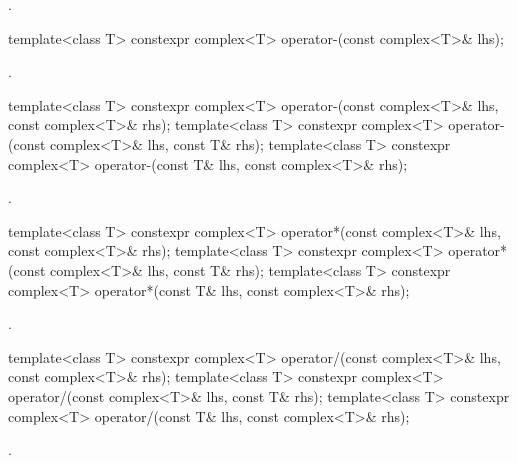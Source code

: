 \begin{itemdescr}
\pnum
\returns
{}.
\end{itemdescr}

%
\begin{itemdecl}
template<class T> constexpr complex<T> operator-(const complex<T>& lhs);
\end{itemdecl}

\begin{itemdescr}
\pnum
\returns
{}.
\end{itemdescr}

%
\begin{itemdecl}
template<class T> constexpr complex<T> operator-(const complex<T>& lhs, const complex<T>& rhs);
template<class T> constexpr complex<T> operator-(const complex<T>& lhs, const T& rhs);
template<class T> constexpr complex<T> operator-(const T& lhs, const complex<T>& rhs);
\end{itemdecl}

\begin{itemdescr}
\pnum
\returns
{}.
\end{itemdescr}

%
\begin{itemdecl}
template<class T> constexpr complex<T> operator*(const complex<T>& lhs, const complex<T>& rhs);
template<class T> constexpr complex<T> operator*(const complex<T>& lhs, const T& rhs);
template<class T> constexpr complex<T> operator*(const T& lhs, const complex<T>& rhs);
\end{itemdecl}

\begin{itemdescr}
\pnum
\returns
{}.
\end{itemdescr}

%
\begin{itemdecl}
template<class T> constexpr complex<T> operator/(const complex<T>& lhs, const complex<T>& rhs);
template<class T> constexpr complex<T> operator/(const complex<T>& lhs, const T& rhs);
template<class T> constexpr complex<T> operator/(const T& lhs, const complex<T>& rhs);
\end{itemdecl}

\begin{itemdescr}
\pnum
\returns
{}.
\end{itemdescr}

